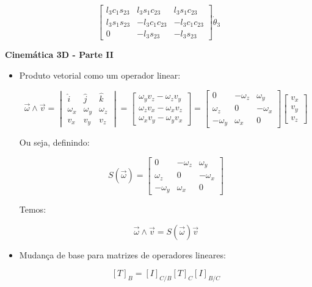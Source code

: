 \documentclass[12pt,a4paper]{article}
\begin{document}
$$ \begin{bmatrix}
l_3 c_1 s_{23} & l_3 s_1 c_{23} &  l_3 s_1 c_{23} \\
l_3 s_1   s_{23} & - l_3 c_1 c_{23} & - l_3 c_1 c_{23} \\
0 &  - l_3 s_{23} & - l_3 s_{23}
\end{bmatrix} \dot{\theta}_3 $$ 
\linebreak

\begin{center}
\textbf{Cinemática 3D - Parte II}
\end{center}


\begin{itemize}



\item Produto vetorial como um operador linear:

$$ \vec{\omega} \wedge \vec{v} = \begin{vmatrix}
\hat{i} & \hat{j} & \hat{k} \\
\omega_x & \omega_y & \omega_z \\
v_x & v_y & v_z
\end{vmatrix} 
= 
\begin{bmatrix}
\omega_y v_z - \omega_z v_y \\
\omega_z v_x - \omega_x v_z \\
\omega_x v_y - \omega_y v_x
\end{bmatrix}
=
\begin{bmatrix}
0 & - \omega_z & \omega_y \\
\omega_z & 0 & - \omega_x \\
- \omega_y & \omega_x & 0
\end{bmatrix}
\begin{bmatrix}
v_x \\
v_y \\
v_z
\end{bmatrix}
 $$
 
Ou seja, definindo:

$$ S(\vec{\omega}) = \begin{bmatrix}
0 & - \omega_z & \omega_y \\
\omega_z & 0 & - \omega_x \\
- \omega_y & \omega_x & 0
\end{bmatrix}
$$

Temos:

$$ \vec{\omega} \wedge \vec{v} = S(\vec{\omega}) \vec{v} $$

\item Mudança de base para matrizes de operadores lineares:

$$ [T]_B = [I]_{C/B} [T]_C [I]_{B/C} $$
\linebreak

\end{itemize}
\end{document}
